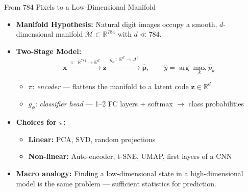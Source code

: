 \documentclass[10pt,english,aspectratio=169]{beamer}
\begin{document}
\begin{frame}{From 784 Pixels to a Low-Dimensional Manifold}
\begin{itemize}
  \item \textbf{Manifold Hypothesis:}
        Natural digit images occupy a smooth, $d$-dimensional manifold
        $\mathcal{M}\subset\mathbb{R}^{784}$ with $d\ll784$.

  \item \textbf{Two-Stage Model:}
        \[
          \mathbf{x}
          \xrightarrow{\;\pi\,:\;\mathbb{R}^{784}\!\!\to\mathbb{R}^{d}\;}
          \mathbf{z}
          \xrightarrow{\;g_{\phi}\,:\;\mathbb{R}^{d}\!\!\to\Delta^{9}\;}
          \hat{\mathbf{p}}
          ,\qquad
          \hat y=\arg\max_k\hat p_k
        \]
        \begin{itemize}
          \item $\pi$: \textit{encoder} --- flattens the manifold to a latent code $\mathbf z\in\mathbb{R}^{d}$
          \item $g_{\phi}$: \textit{classifier head} --- 1--2 FC layers + softmax $\to$ class probabilities
        \end{itemize}

  \item \textbf{Choices for $\pi$:}
        \begin{itemize}
          \item \textbf{Linear:} PCA, SVD, random projections
          \item \textbf{Non-linear:} Auto-encoder, t-SNE, UMAP, first layers of a CNN
        \end{itemize}

  \item \textbf{Macro analogy:} Finding a low-dimensional state in a high-dimensional model is the same problem --- sufficient statistics for prediction.
\end{itemize}
\end{frame}
\end{document}
